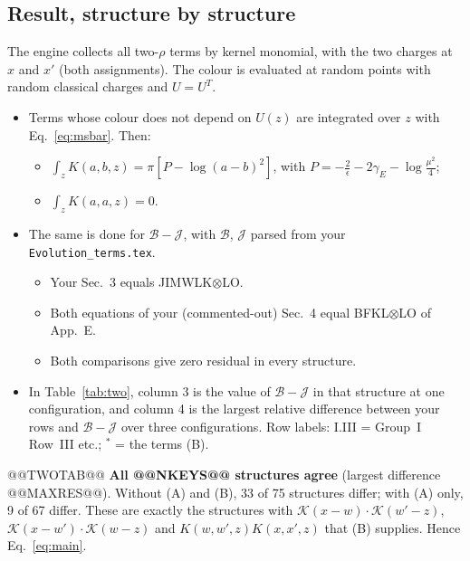 \documentclass[10pt]{article}
\numberwithin{equation}{section}
\newcommand{\KK}{\mathcal K}
\newcommand{\BB}{\mathcal B}
\newcommand{\JJ}{\mathcal J}
\begin{document}
\subsection{Result, structure by structure}
The engine collects all two-$\rho$ terms by kernel monomial, with the two charges at $x$ and $x'$ (both assignments). The colour is evaluated at random points with random classical charges and $U=U^T$.
\begin{itemize}
\item Terms whose colour does not depend on $U(z)$ are integrated over $z$ with Eq.~\eqref{eq:msbar}. Then:
\begin{itemize}
\item $\int_zK(a,b,z)=\pi[P-\log(a-b)^2]$, with $P=-\frac2\epsilon-2\gamma_E-\log\frac{\mu^2}{4}$;
\item $\int_zK(a,a,z)=0$.
\end{itemize}
\item The same is done for $\BB-\JJ$, with $\BB$, $\JJ$ parsed from your \texttt{Evolution\_terms.tex}.
\begin{itemize}
\item Your Sec.~3 equals JIMWLK$\otimes$LO.
\item Both equations of your (commented-out) Sec.~4 equal BFKL$\otimes$LO of App.~E.
\item Both comparisons give zero residual in every structure.
\end{itemize}
\item In Table~\ref{tab:two}, column 3 is the value of $\BB-\JJ$ in that structure at one configuration, and column 4 is the largest relative difference between your rows and $\BB-\JJ$ over three configurations. Row labels: I.III = Group~I Row~III etc.; ${}^{*}$ = the terms (B).
\end{itemize}
@@TWOTAB@@
\noindent\textbf{All @@NKEYS@@ structures agree} (largest difference @@MAXRES@@). Without (A) and (B), 33 of 75 structures differ; with (A) only, 9 of 67 differ. These are exactly the structures with $\KK(x-w)\cdot\KK(w'-z)$, $\KK(x-w')\cdot\KK(w-z)$ and $K(w,w',z)K(x,x',z)$ that (B) supplies. Hence Eq.~\eqref{eq:main}.

\end{document}
